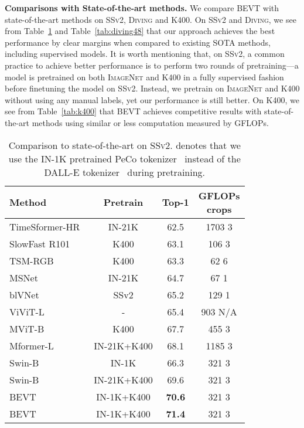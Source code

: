 \documentclass[10pt,twocolumn,letterpaper]{article}
\makeatletter
\newcommand*{\system}{BEVT\@\xspace}
\newcommand{\ssv}{{\scshape SSv2}\xspace}
\newcommand{\diving}{{\scshape Diving\-48}\xspace}
\newcommand{\kn}{{\scshape K400}\xspace}
\newcommand{\inet}{{\scshape ImageNet}\xspace}
\newcommand{\ra}[1]{\renewcommand{\arraystretch}{#1}}
\makeatother
\begin{document}
\vspace{0.05in}
\noindent\textbf{Comparisons with State-of-the-art methods.} We compare \system with state-of-the-art methods on \ssv, \diving and \kn. On \ssv and \diving, we see from Table~\ref{tab:ssv2} and Table~\ref{tab:diving48} that our approach achieves the best performance by clear margins when compared to existing SOTA methods, including supervised models. It is worth mentioning that, on \ssv, a common practice to achieve better performance is to perform two rounds of pretraining---a model is  pretrained on both \inet and \kn in a fully supervised fashion before finetuning the model on \ssv. Instead, we pretrain on \inet and \kn without using any manual labels, yet our performance is still better. On \kn, we see from Table~\ref{tab:k400} that \system achieves competitive results with state-of-the-art methods using similar or less computation measured by GFLOPs.





\begin{table}
  \centering
  \ra{1.0}
  \setlength{\tabcolsep}{0pt} \begin{tabular*}{\linewidth}{@{\extracolsep{\fill}}lccc@{}}
    \toprule
    Method & Pretrain & Top-1 & \makecell[c]{GFLOPs \\  crops} \\
    \midrule
    TimeSformer-HR~\cite{gberta_2021_ICML} & IN-21K & 62.5 & 1703  3 \\
    SlowFast R101~\cite{slowfast} & K400 & 63.1 & 106  3 \\
    TSM-RGB~\cite{tsm} & K400 & 63.3 & 62  6 \\
    MSNet~\cite{kwon2020motionsqueeze} & IN-21K & 64.7 & 67  1 \\
    blVNet~\cite{fan2019more} & SSv2 & 65.2 & 129  1 \\
    ViViT-L~\cite{arnab2021vivit} & - & 65.4 & 903  N/A \\
    MViT-B~\cite{fan2021multiscale} & K400 & 67.7 & 455  3 \\
    Mformer-L~\cite{patrick2021keeping} & IN-21K+K400 & 68.1 & 1185  3 \\
    Swin-B~\cite{liu2021video} & IN-1K & 66.3 & 321  3 \\
    Swin-B~\cite{liu2021video} & IN-21K+K400 & 69.6 & 321  3 \\
    \midrule
BEVT & IN-1K+K400 & \textbf{70.6} & 321  3 \\
    BEVT  & IN-1K+K400 & \textbf{71.4} & 321  3 \\
    \bottomrule
  \end{tabular*}
  \caption{Comparison to state-of-the-art on \ssv.  denotes that we use the IN-1K pretrained PeCo tokenizer~\cite{dong2021peco} instead of the DALL-E tokenizer~\cite{dalle} during pretraining.}
  \label{tab:ssv2}
  \vspace{-1em}
\end{table}
\end{document}
